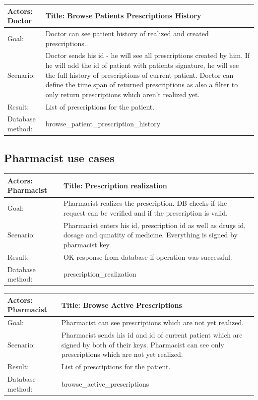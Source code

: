     \begin{longtable}{| p{6cm} | p{7.75cm} |}
    \hline
    Actors: Doctor &Title: Browse Patients Prescriptions History \\ \hline
    Goal: & Doctor can see patient history of realized and created prescriptions..\\ \hline
    Scenario: & Doctor sends his id - he will see all prescriptions created by him. If he will add the id of patient with patients signature, he will see the full history of prescriptions of current patient. Doctor can define the time span of returned prescriptions as also a filter to only return prescriptions which aren't realized yet. \\ \hline
    Result: & List of prescriptions for the patient. \\ \hline
    Database  method: & browse\_patient\_prescription\_history \\ \hline
    \end{longtable}


\subsection{Pharmacist use cases}


    \begin{longtable}{| p{6cm} | p{7.75cm} |}
    \hline
    Actors: Pharmacist &Title: Prescription realization\\ \hline
    Goal: & Pharmacist realizes the prescription. DB checks if the request can be verified and if the prescription is valid.\\ \hline
    Scenario: & Pharmacist enters his id, prescription id as well as drugs id, dosage and qunatity of medicine. Everything is signed by pharmacist key. \\ \hline
    Result: & OK response from database if operation was successful. \\ \hline
    Database  method: & prescription\_realization \\ \hline
    \end{longtable}



    \begin{longtable}{| p{6cm} | p{7.75cm} |}
    \hline
    Actors: Pharmacist &Title: Browse Active Prescriptions \\ \hline
    Goal: & Pharmacist can see prescriptions which are not yet realized. \\ \hline
    Scenario: & Pharmacist sends his id and id of current patient which are signed by both of their keys. Pharmacist can see only prescriptions which are not yet realized. \\ \hline
    Result: & List of prescriptions for the patient. \\ \hline
    Database  method: & browse\_active\_prescriptions \\ \hline
    \end{longtable}


